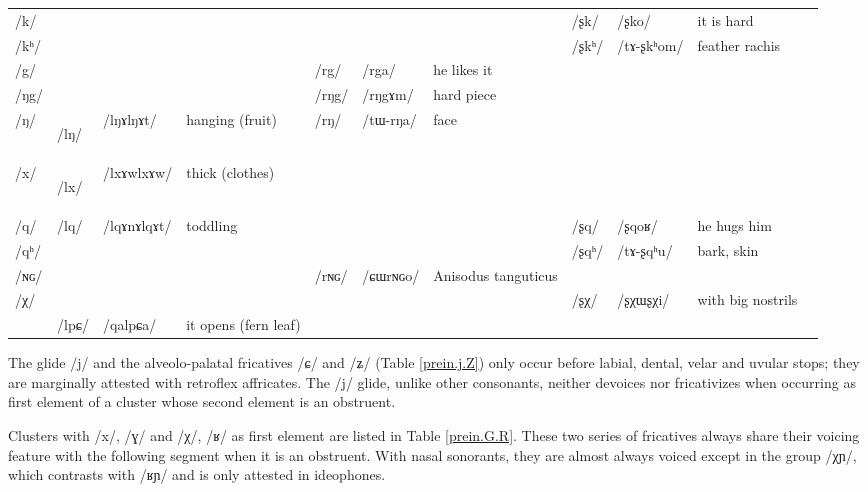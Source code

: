 \documentclass[oneside,a4paper,11pt]{article}
\newcommand{\ipa}[1]{\mbox{\phon/#1/}}
\newcommand{\deux}[1]{\ipa{#1}\addtocounter{2clusters}{1}}
\newcommand{\trois}[1]{\ipa{#1}\addtocounter{3clusters}{1}}
\newcommand{\idph}[1]{\cellcolor{gray}\textbf{#1}}
\newcommand{\resetcounters}[2]{
\newcounter{#1}
\newcounter{#2}
 \setcounter{#1}{\value{2clusters}}
  \setcounter{#2}{\value{3clusters}}
 \setcounter{2clusters}{0}
  \setcounter{3clusters}{0}
}
\begin{document}
\begin{landscape}
\begin{table}
\begin{tabular}{l|lll|lll|lll|l}
\toprule
\ipa{k}  & 	  & 	  & 	  & 	 & 	 & 	 & 	 \deux{ʂk}  & 	 \ipa{ʂko}  & 	 it is hard & 	\\	
\ipa{kʰ}  & 	  & 	  & 	  & 	 & 	 & 	 & 	 \deux{ʂkʰ}  & 	 \ipa{tɤ-ʂkʰom}  & 	 feather rachis & 	\\	
\ipa{g}  & 	  & 	  & 	  & 	 \deux{rg}  & 	 \ipa{rga}  & 	 he likes it & 	 & 	 & 	 & 	\\	
\ipa{ŋg}  & 	  & 	  & 	  & 	 \deux{rŋg}  & 	 \ipa{rŋgɤm}  & 	hard piece  & 	 & 	 & 	 & 	\\	
\ipa{ŋ}  & 	 \deux{lŋ} \idph{}  & 	 \ipa{lŋɤlŋɤt}  & 	hanging (fruit)  & 	 \deux{rŋ}  & 	 \ipa{tɯ-rŋa}  & 	 face & 	 & 	 & 	 & 	\\	
\ipa{x}  & 	 \deux{lx} \idph{}  & 	 \ipa{lxɤwlxɤw}  & 	thick (clothes)  & 	  & 	  & 	  & 	 & 	 & 	 & 	\\	
\ipa{q}  & 	\deux{lq}  & \ipa{lqɤnɤlqɤt}	  &toddling	  & 	 & 	 & 	 & 	 \deux{ʂq}  & 	 \ipa{ʂqoʁ}  & 	he hugs him  & 	\\	
\ipa{qʰ}  & 	  & 	  & 	  & 	 & 	 & 	 & 	 \deux{ʂqʰ}  & 	 \ipa{tɤ-ʂqʰu}  & 	bark, skin & 	\\	
\ipa{ɴɢ}  & 	  & 	  & 	  & 	 \deux{rɴɢ}  & 	 \ipa{ɕɯrɴɢo}  & 	Anisodus tanguticus  & 	 & 	 & 	 & 	\\	
\ipa{χ}  & 	  & 	  & 	  & 	 & 	 & 	 & 	 \deux{ʂχ}  & 	 \ipa{ʂχɯʂχi}  & 	with big nostrils  & 	\\	
\midrule
&\trois{lpɕ}	&\ipa{qalpɕa} & it opens (fern leaf) \\
\bottomrule
\end{tabular}%
\end{table}
\end{landscape}
 \resetcounters{2lrC}{3lrC} %
  The glide \ipa{j}  and the alveolo-palatal fricatives \ipa{ɕ} and \ipa{ʑ} (Table \ref{prein.j.Z}) only occur before labial, dental, velar and uvular stops; they are marginally attested with retroflex affricates. The \ipa{j} glide, unlike other consonants, neither devoices nor fricativizes when occurring as first element of a cluster whose second element is an obstruent.


  Clusters with   \ipa{x}, \ipa{ɣ} and \ipa{χ}, \ipa{ʁ} as first element are listed in Table \ref{prein.G.R}. These two series of fricatives  always share their voicing feature with the following segment when it is an obstruent. With nasal sonorants, they are  almost always voiced except in the group \ipa{χɲ}, which contrasts with \ipa{ʁɲ} and is only attested in ideophones.
  
\end{document}
